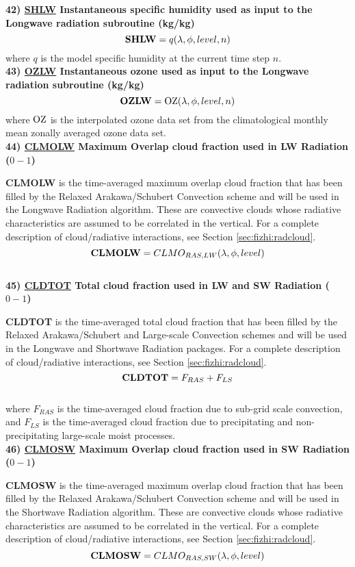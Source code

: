  
\noindent
{\bf 42)  \underline {SHLW} Instantaneous specific humidity used as input to
 the Longwave radiation subroutine (kg/kg)}
\[
{\bf SHLW}  = q(\lambda , \phi , level , n)
\]
\noindent
where $q$ is the model specific humidity at the current time step $n$.
\\
 
 
\noindent
{\bf 43)  \underline {OZLW} Instantaneous ozone used as input to
 the Longwave radiation subroutine (kg/kg)}
\[
{\bf OZLW}  = {\rm OZ}(\lambda , \phi , level , n)
\]
\noindent
where $\rm OZ$ is the interpolated ozone data set from the climatological monthly
mean zonally averaged ozone data set.
\\
 

\noindent
{\bf 44) \underline {CLMOLW} Maximum Overlap cloud fraction used in LW Radiation ($0-1$) }

\noindent
{\bf CLMOLW} is the time-averaged maximum overlap cloud fraction that has been filled by the Relaxed
Arakawa/Schubert Convection scheme and will be used in the Longwave Radiation algorithm.  These are
convective clouds whose radiative characteristics are assumed to be correlated in the vertical.
For a complete description of cloud/radiative interactions, see Section \ref{sec:fizhi:radcloud}.
\[
{\bf CLMOLW} = CLMO_{RAS,LW}(\lambda, \phi,  level )
\]
\\
 

{\bf 45) \underline {CLDTOT} Total cloud fraction used in LW and SW Radiation ($0-1$) }

{\bf CLDTOT} is the time-averaged total cloud fraction that has been filled by the Relaxed
Arakawa/Schubert and Large-scale Convection schemes and will be used in the Longwave and Shortwave
Radiation packages.
For a complete description of cloud/radiative interactions, see Section \ref{sec:fizhi:radcloud}.
\[
{\bf CLDTOT} = F_{RAS} + F_{LS}
\]
\\
where $F_{RAS}$ is the time-averaged cloud fraction due to sub-grid scale convection, and $F_{LS}$ is the
time-averaged cloud fraction due to precipitating and non-precipitating large-scale moist processes.
\\


\noindent
{\bf 46) \underline {CLMOSW} Maximum Overlap cloud fraction used in SW Radiation ($0-1$) }

\noindent
{\bf CLMOSW} is the time-averaged maximum overlap cloud fraction that has been filled by the Relaxed
Arakawa/Schubert Convection scheme and will be used in the Shortwave Radiation algorithm.  These are
convective clouds whose radiative characteristics are assumed to be correlated in the vertical.
For a complete description of cloud/radiative interactions, see Section \ref{sec:fizhi:radcloud}.
\[
{\bf CLMOSW} = CLMO_{RAS,SW}(\lambda, \phi,  level )
\]
\\

